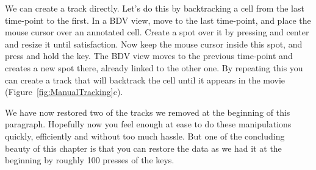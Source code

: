 We can create a track directly.
Let's do this by backtracking a cell from the last time-point to the first.
In a BDV view, move to the last time-point, and place the mouse cursor over an annotated cell. 
Create a spot over it by pressing  and center and resize it until satisfaction.
Now keep the mouse cursor inside this spot, and press  and hold the  key.
The BDV view moves to the previous time-point and creates a new spot there, already linked to the other one.
By repeating this you can create a track that will backtrack the cell until it appears in the movie (Figure~\ref{fig:ManualTracking}c).

We have now restored two of the tracks we removed at the beginning of this paragraph.
Hopefully now you feel enough at ease to do these manipulations quickly, efficiently and without too much hassle.
But one of the concluding beauty of this chapter is that you can restore the data as we had it at the beginning by roughly 100 presses of the  keys.
